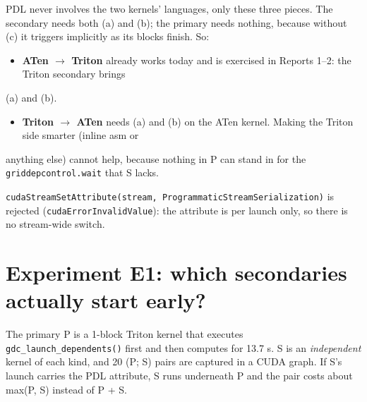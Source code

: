 \documentclass[10pt]{article}
\begin{document}
PDL never involves the two kernels' languages, only these three pieces. The secondary needs both (a) and (b); the primary needs nothing, because without (c) it triggers implicitly as its blocks finish. So:


\begin{itemize}
\item \textbf{ATen $\rightarrow$ Triton} already works today and is exercised in Reports 1--2: the Triton secondary brings
\end{itemize}
(a) and (b).

\begin{itemize}
\item \textbf{Triton $\rightarrow$ ATen} needs (a) and (b) on the ATen kernel. Making the Triton side smarter (inline asm or
\end{itemize}
anything else) cannot help, because nothing in P can stand in for the \texttt{griddepcontrol.wait} that S lacks.


\texttt{cudaStreamSetAttribute(stream, ProgrammaticStreamSerialization)} is rejected (\texttt{cudaErrorInvalidValue}): the attribute is per launch only, so there is no stream-wide switch.


\section{Experiment E1: which secondaries actually start early?}

The primary P is a 1-block Triton kernel that executes \texttt{gdc\_launch\_dependents()} first and then computes for 13.7 \textmu{}s. S is an \emph{independent} kernel of each kind, and 20 (P; S) pairs are captured in a CUDA graph. If S's launch carries the PDL attribute, S runs underneath P and the pair costs about max(P, S) instead of P + S.
\end{document}

